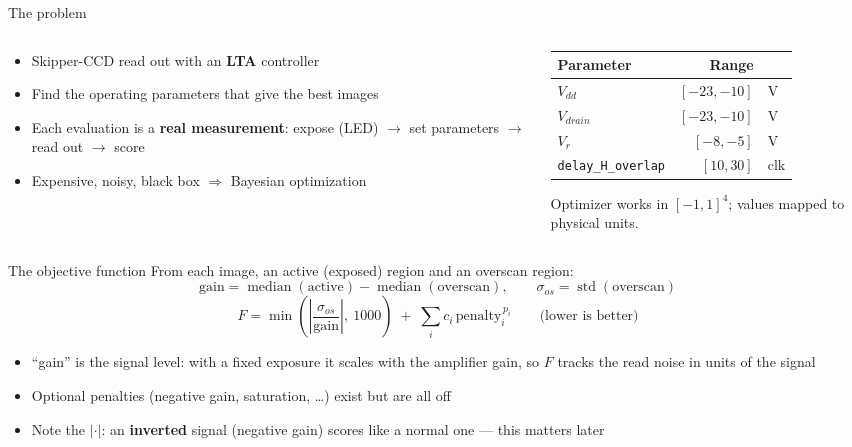 \documentclass[aspectratio=169,10pt]{beamer}
\begin{document}
\begin{frame}{The problem}
  \begin{columns}[T]
    \begin{column}{0.52\textwidth}
      \begin{itemize}
        \item Skipper-CCD read out with an \textbf{LTA} controller
        \item Find the operating parameters that give the best images
        \item Each evaluation is a \textbf{real measurement}:
              expose (LED) $\rightarrow$ set parameters $\rightarrow$ read out
              $\rightarrow$ score
        \item Expensive, noisy, black box $\Rightarrow$ Bayesian optimization
      \end{itemize}
    \end{column}
    \begin{column}{0.44\textwidth}
      \centering\small
      \begin{tabular}{lrl}
        \toprule
        Parameter & Range & \\
        \midrule
        $V_{dd}$         & $[-23,-10]$ & V \\
        $V_{drain}$      & $[-23,-10]$ & V \\
        $V_{r}$          & $[-8,-5]$   & V \\
        \texttt{delay\_H\_overlap} & $[10,30]$ & clk \\
        \bottomrule
      \end{tabular}

      \vspace{2mm}
      {\scriptsize Optimizer works in $[-1,1]^4$; values mapped to physical units.}
    \end{column}
  \end{columns}
\end{frame}

\begin{frame}{The objective function}
  From each image, an active (exposed) region and an overscan region:
  \[
    \text{gain} = \operatorname{median}(\text{active}) - \operatorname{median}(\text{overscan}),
    \qquad
    \sigma_{os} = \operatorname{std}(\text{overscan})
  \]
  \[
    F = \min\!\left(\left|\frac{\sigma_{os}}{\text{gain}}\right|,\ 1000\right)
        \;+\; \sum_i c_i\,\text{penalty}_i^{\,p_i}
    \qquad\text{(lower is better)}
  \]
  \begin{itemize}
    \item ``gain'' is the signal level: with a fixed exposure it scales with the amplifier gain,
          so $F$ tracks the read noise in units of the signal
    \item Optional penalties (negative gain, saturation, \dots) exist but are all off
    \item Note the $|\cdot|$: an \textbf{inverted} signal (negative gain) scores like a normal one
          --- this matters later
  \end{itemize}
\end{frame}
\end{document}
